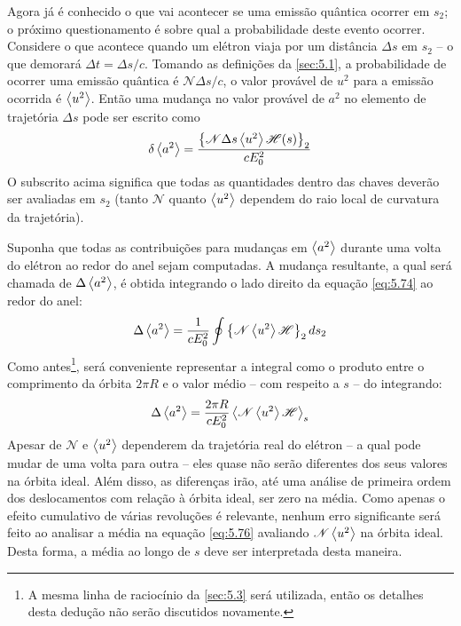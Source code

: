 Agora já é conhecido o que vai acontecer se uma emissão quântica ocorrer em $s_2$; o próximo questionamento é sobre qual a probabilidade deste evento ocorrer. Considere o que acontece quando um elétron viaja por um distância $\Delta s$ em $s_2$ -- o que demorará $\Delta t = \Delta s/c$. Tomando as definições da \autoref{sec:5.1}, a probabilidade de ocorrer uma emissão quântica é $\mathscr{N} \Delta s/c$, o valor provável de $u^2$ para a emissão ocorrida é $\left< u^2 \right>$. Então uma mudança no valor provável de $a^2$ no elemento de trajetória $\Delta s$ pode ser escrito como
\begin{align}
	\delta \left< a^2 \right> = \frac{\left\{\mathscr{N} \Delta s \left< u^2 \right>\mathscr{H}(s)\right\}_2}{c E_0^2}\label{eq:5.74}
\end{align}
O subscrito acima significa que todas as quantidades dentro das chaves deverão ser avaliadas em $s_2$ (tanto $\mathscr{N}$ quanto $\left< u^2 \right>$ dependem do raio local de curvatura da trajetória).

Suponha que todas as contribuições para mudanças em $\left< a^2 \right>$ durante uma volta do elétron ao redor do anel sejam computadas. A mudança resultante, a qual será chamada de $\Delta \left< a^2 \right>$, é obtida integrando o lado direito da equação \eqref{eq:5.74} ao redor do anel:
\begin{align}
	\Delta \left< a^2 \right> = \frac{1}{c E_0^2} \oint \left\{\mathscr{N} \left< u^2 \right> \mathscr{H}\right\}_2 ds_2
\end{align}
Como antes\footnote{A mesma linha de raciocínio da \autoref{sec:5.3} será utilizada, então os detalhes desta dedução não serão discutidos novamente.}, será conveniente representar a integral como o produto entre o comprimento da órbita $2\pi R$ e o valor médio -- com respeito a $s$ -- do integrando:
\begin{align}
	\Delta \left< a^2 \right> = \frac{2 \pi R}{c E_0^2}\left< \mathscr{N} \left< u^2 \right> \mathscr{H} \right>_s\label{eq:5.76}
\end{align}
Apesar de $\mathscr{N}$ e $\left< u^2 \right>$ dependerem da trajetória real do elétron -- a qual pode mudar de uma volta para outra -- eles quase não serão diferentes dos seus valores na órbita ideal. Além disso, as diferenças irão, até uma análise de primeira ordem dos deslocamentos com relação à órbita ideal, ser zero na média. Como apenas o efeito cumulativo de várias revoluções é relevante, nenhum erro significante será feito ao analisar a média na equação \eqref{eq:5.76} avaliando $\mathscr{N}\left< u^2 \right>$ na órbita ideal. Desta forma, a média ao longo de $s$ deve ser interpretada desta maneira.

